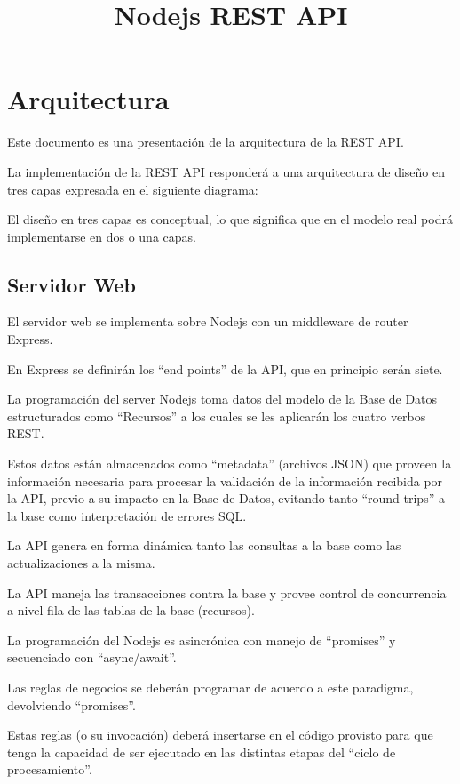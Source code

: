 \documentclass{novela}
\title{Nodejs REST API}
\author{}
\date{}
\begin{document}
  \frontmatter
  \maketitle
  \tableofcontents
  \mainmatter

\chapter{Arquitectura}


Este documento es una presentación de la arquitectura de la REST API.

La implementación de la REST API responderá a una arquitectura de diseño en tres
capas expresada en el siguiente diagrama:


El diseño en tres capas es conceptual, lo que significa que en el modelo real podrá
implementarse en dos o una capas.

\section{Servidor Web}

El servidor web se implementa sobre Nodejs con un middleware de router Express.

En Express se definirán los “end points” de la API, que en principio serán siete.

La programación del server Nodejs toma datos del modelo de la Base de Datos
estructurados como “Recursos” a los cuales se les aplicarán los cuatro verbos REST.

Estos datos están almacenados como “metadata” (archivos JSON) que proveen la
información necesaria para procesar la validación de la información recibida por la API,
previo a su impacto en la Base de Datos, evitando tanto “round trips” a la base como
interpretación de errores SQL.

La API genera en forma dinámica tanto las consultas a la base como las actualizaciones
a la misma.

La API maneja las transacciones contra la base y provee control de concurrencia a nivel
fila de las tablas de la base (recursos).

La programación del Nodejs es asincrónica con manejo de “promises” y secuenciado
con “async/await”.

Las reglas de negocios se deberán programar de acuerdo a este paradigma,
devolviendo “promises”.

Estas reglas (o su invocación) deberá insertarse en el código provisto para que tenga la
capacidad de ser ejecutado en las distintas etapas del “ciclo de procesamiento”.
\end{document}
